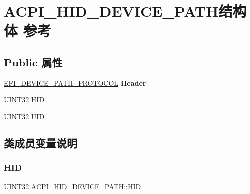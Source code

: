 \hypertarget{struct_a_c_p_i___h_i_d___d_e_v_i_c_e___p_a_t_h}{}\section{A\+C\+P\+I\+\_\+\+H\+I\+D\+\_\+\+D\+E\+V\+I\+C\+E\+\_\+\+P\+A\+T\+H结构体 参考}
\label{struct_a_c_p_i___h_i_d___d_e_v_i_c_e___p_a_t_h}
\subsection*{Public 属性}
\begin{DoxyCompactItemize}
\item 
\mbox{\label{struct_a_c_p_i___h_i_d___d_e_v_i_c_e___p_a_t_h_aba6d2abffaef3d8bb3247e5c4e17c7e0}} 
\hyperlink{struct_e_f_i___d_e_v_i_c_e___p_a_t_h___p_r_o_t_o_c_o_l}{E\+F\+I\+\_\+\+D\+E\+V\+I\+C\+E\+\_\+\+P\+A\+T\+H\+\_\+\+P\+R\+O\+T\+O\+C\+OL} {\bfseries Header}
\item 
\hyperlink{_processor_bind_8h_ae1e6edbbc26d6fbc71a90190d0266018}{U\+I\+N\+T32} \hyperlink{struct_a_c_p_i___h_i_d___d_e_v_i_c_e___p_a_t_h_a3992f28fa7c2048dce8908b7d96c0c1d}{H\+ID}
\item 
\hyperlink{_processor_bind_8h_ae1e6edbbc26d6fbc71a90190d0266018}{U\+I\+N\+T32} \hyperlink{struct_a_c_p_i___h_i_d___d_e_v_i_c_e___p_a_t_h_a93013cae5fc357807aa9fb8f4b6e74c1}{U\+ID}
\end{DoxyCompactItemize}


\subsection{类成员变量说明}
\mbox{\label{struct_a_c_p_i___h_i_d___d_e_v_i_c_e___p_a_t_h_a3992f28fa7c2048dce8908b7d96c0c1d}} 
\subsubsection{\texorpdfstring{H\+ID}{HID}}
{\footnotesize\ttfamily \hyperlink{_processor_bind_8h_ae1e6edbbc26d6fbc71a90190d0266018}{U\+I\+N\+T32} A\+C\+P\+I\+\_\+\+H\+I\+D\+\_\+\+D\+E\+V\+I\+C\+E\+\_\+\+P\+A\+T\+H\+::\+H\+ID}

